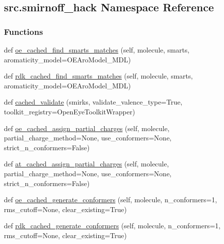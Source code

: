 \hypertarget{namespacesrc_1_1smirnoff__hack}{}\subsection{src.\+smirnoff\+\_\+hack Namespace Reference}
\label{namespacesrc_1_1smirnoff__hack}
\subsubsection*{Functions}
\begin{DoxyCompactItemize}
\item 
def \hyperlink{namespacesrc_1_1smirnoff__hack_afffd5f3b5ab48d5fd5e976ac1a7aea30}{oe\+\_\+cached\+\_\+find\+\_\+smarts\+\_\+matches} (self, molecule, smarts, aromaticity\+\_\+model=\textquotesingle{}O\+E\+Aro\+Model\+\_\+\+M\+DL\textquotesingle{})
\item 
def \hyperlink{namespacesrc_1_1smirnoff__hack_a669420dbb65d1007fb20e65c9712c564}{rdk\+\_\+cached\+\_\+find\+\_\+smarts\+\_\+matches} (self, molecule, smarts, aromaticity\+\_\+model=\textquotesingle{}O\+E\+Aro\+Model\+\_\+\+M\+DL\textquotesingle{})
\item 
def \hyperlink{namespacesrc_1_1smirnoff__hack_a6a49d7ed65819ec63d5d3fd383ff1e16}{cached\+\_\+validate} (smirks, validate\+\_\+valence\+\_\+type=True, toolkit\+\_\+registry=Open\+Eye\+Toolkit\+Wrapper)
\item 
def \hyperlink{namespacesrc_1_1smirnoff__hack_a06941e60fa309f7a237e9f62b8d31a1a}{oe\+\_\+cached\+\_\+assign\+\_\+partial\+\_\+charges} (self, molecule, partial\+\_\+charge\+\_\+method=None, use\+\_\+conformers=None, strict\+\_\+n\+\_\+conformers=False)
\item 
def \hyperlink{namespacesrc_1_1smirnoff__hack_a8edfb04dec94c4a555b6cdd8396074be}{at\+\_\+cached\+\_\+assign\+\_\+partial\+\_\+charges} (self, molecule, partial\+\_\+charge\+\_\+method=None, use\+\_\+conformers=None, strict\+\_\+n\+\_\+conformers=False)
\item 
def \hyperlink{namespacesrc_1_1smirnoff__hack_ab09604f96254abb1e900f34492aa89c4}{oe\+\_\+cached\+\_\+generate\+\_\+conformers} (self, molecule, n\+\_\+conformers=1, rms\+\_\+cutoff=None, clear\+\_\+existing=True)
\item 
def \hyperlink{namespacesrc_1_1smirnoff__hack_ab16c07d1d10df893e4bd3c47f09e46dd}{rdk\+\_\+cached\+\_\+generate\+\_\+conformers} (self, molecule, n\+\_\+conformers=1, rms\+\_\+cutoff=None, clear\+\_\+existing=True)
\end{DoxyCompactItemize}
